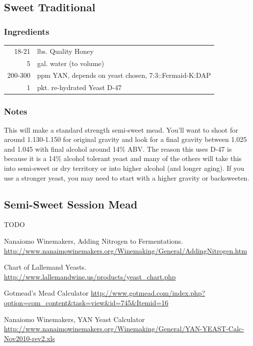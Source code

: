 \documentclass{article}
\begin{document}
{ \subsection{Sweet Traditional}

  \subsubsection*{Ingredients}
   \begin{tabular}{ d  l }
    18-21 & lbs. Quality Honey \\
    5 & gal. water (to volume)\\
    200-300 & ppm YAN, depends on yeast chosen, 7:3::Fermaid-K:DAP\\
    1 & pkt. re-hydrated Yeast D-47\\
   \end{tabular}

  \subsubsection*{Notes}
   This will make a standard strength semi-sweet mead. You'll want to shoot for around 1.130-1.150 for original gravity and look for a final gravity between 1.025 and 1.045 with final alcohol around 14\% ABV. The reason this uses D-47 is because it is a 14\% alcohol tolerant yeast and many of the others will take this into semi-sweet or dry territory or into higher alcohol (and longer aging). If you use a stronger yeast, you may need to start with a higher gravity or backsweeten.

 \subsection{Semi-Sweet Session Mead}
TODO

\newpage
\begin{thebibliography}{99}
  Nanaiomo Winemakers, Adding Nitrogen to Fermentations.
  \url{http://www.nanaimowinemakers.org/Winemaking/General/AddingNitrogen.htm}

  Chart of Lallemand Yeasts.
  \url{http://www.lallemandwine.us/products/yeast_chart.php}

  Gotmead's Mead Calculator
  \url{http://www.gotmead.com/index.php?option=com_content&task=view&id=745&Itemid=16}

  Nanaiomo Winemakers, YAN Yeast Calculator
  \url{http://www.nanaimowinemakers.org/Winemaking/General/YAN-YEAST-Calc-Nov2010-rev2.xls}


\end{thebibliography}}
\end{document}
